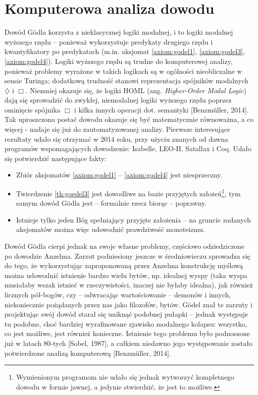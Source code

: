 \documentclass{eiti-raport}
\begin{document}
\section{Komputerowa analiza dowodu}
Dowód G\"odla korzysta z nieklasycznej logiki modalnej, i to logiki modalnej wyższego rzędu -- ponieważ wykorzystuje predykaty drugiego rzędu i kwantyfikatory po predykatach (m.in. aksjomat \ref{axiom:godel1}, \ref{axiom:godel3}, \ref{axiom:godel4}). Logiki wyższego rzędu są trudne do komputerowej analizy, ponieważ problemy wyrażone w takich logikach są w ogólności nieobliczalne w sensie Turinga; dodatkową trudność stanowi reprezentacja spójników modalnych $\diamondsuit$ i $\Box$. Niemniej okazuje się, że logiki HOML (ang. \textit{Higher-Order Modal Logic}) dają się sprowadzić do zwykłej, niemodalnej logiki wyższego rzędu poprzez ominięcie spójnika $\Box$ i kilka innych operacji dot. semantyki [Benzm\"uller, 2014]. Tak uproszczona postać dowodu okazuje się być matematycznie równoważna, a co więcej - nadaje się już do zautomatyzowanej analizy. Pierwsze interesujące rezultaty udało się otrzymać w 2014 roku, przy użyciu znanych od dawna programów wspomagających dowodzenie: Isabelle, LEO-II, Satallax i Coq. Udało się potwierdzić następujące fakty:
\begin{itemize}
	\item Zbiór aksjomatów \ref{axiom:godel1} -- \ref{axiom:godel4} jest niesprzeczny. 
	\item Twierdzenie \ref{th:goedel3} jest dowodliwe na bazie przyjętych założeń\footnote{Wymienionym programom nie udało się jednak wytworzyć kompletnego dowodu w formie jawnej, a jedynie stwierdzić, że jest to możliwe. }, tym samym dowód G\"odla jest -- formalnie rzecz biorąc -- poprawny.
	\item Istnieje tylko jeden Bóg spełniający przyjęte założenia -- na  gruncie zadanych aksjomatów można więc udowodnić prawdziwość monoteizmu. 
\end{itemize}

Dowód G\"odla cierpi jednak na swoje własne problemy, częściowo odziedziczone po dowodzie Anzelma. Zarzut podniesiony jeszcze w średniowieczu sprowadza się do tego, że wykorzystując zaproponowaną przez Anzelma konstrukcję myślową można udowodnić istnienie bardzo wielu bytów, np. idealnej wyspy (taka wyspa musiałaby wszak istnieć w rzeczywistości, inaczej nie byłaby idealna), jak również licznych pół-bogów, czy -- odwracając wartościowanie -- demonów i innych, niekoniecznie pożądanych przez nas jako filozofów, bytów. G\"odel znał te zarzuty i projektując swój dowód starał się uniknąć podobnej pułapki -- jednak występuje tu podobne, choć bardziej wyrafinowane zjawisko modalnego kolapsu: wszystko, co jest możliwe, jest również konieczne. Istnienie tego problemu było podnoszone już w latach 80-tych [Sobel, 1987], a całkiem niedawno jego występowanie zostało potwierdzone analizą komputerową [Benzm\"uller, 2014]. 
\end{document}
